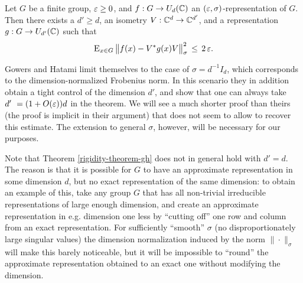 \begin{theorem}
\label{theorem-gh}
Let $G$ be a finite group, $\varepsilon\geq 0$, and $f:G\to U_d(\mathbb{C})$ an $(\varepsilon,\sigma)$-representation of $G$. Then there exists a $d'\geq d$, an isometry $V:\mathbb{C}^d\to \mathbb{C}^{d'}$, and a representation $g:G\to U_{d'}(\mathbb{C})$ such that 
$$\textsc{E}_{x\in G}\, \big\| f(x) - V^*g(x)V \big\|_\sigma^2\, \leq\, 2\,\varepsilon.$$ 
\end{theorem}

Gowers and Hatami limit themselves to the case of $\sigma = d^{-1}I_d$, which corresponds to the dimension-normalized Frobenius norm. In this scenario they in addition obtain a tight control of the dimension $d'$, and show that one can always take $d'\ = (1+O(\varepsilon))d$ in the theorem. We will see a much shorter proof than theirs (the proof is implicit in their argument) that does not seem to allow to recover this estimate. The extension to general $\sigma$, however, will be necessary for our purposes.

Note that  Theorem \ref{rigidity-theorem-gh} does not in general hold  with $d'=d$. The reason is that it is possible for $G$ to have an approximate representation in some dimension $d$, but no exact representation of the same dimension: to obtain an example of this, take any group $G$ that has all non-trivial irreducible representations of large enough dimension, and create an approximate representation in e.g. dimension one less by ``cutting off'' one row and column from an exact representation. For sufficiently ``smooth'' $\sigma$ (no disproportionately large singular values) the dimension normalization induced by the norm $\|\cdot\|_\sigma$ will make this barely  noticeable, but it will be impossible to ``round'' the approximate representation obtained to an exact one without modifying the dimension. 

